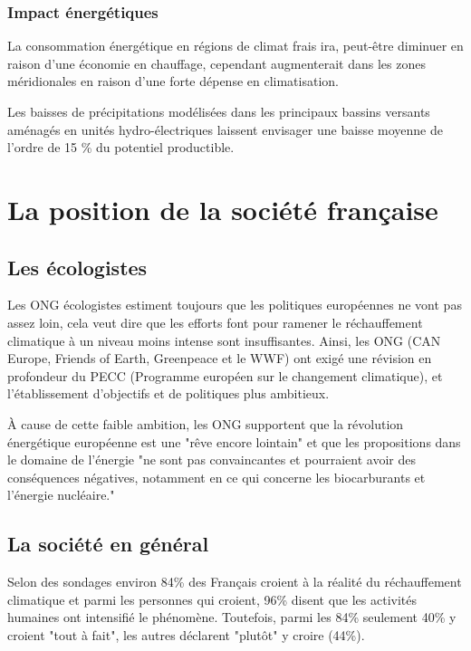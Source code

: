 \documentclass[a4paper,11pt]{article}
\begin{document}
\subsubsection*{Impact énergétiques}
La consommation énergétique  en régions de climat frais  ira, peut-être diminuer
en raison  d'une économie  en chauffage, cependant  augmenterait dans  les zones
méridionales en raison d'une forte dépense en climatisation.

Les baisses de précipitations modélisées dans les principaux bassins versants
aménagés en unités hydro-électriques laissent envisager une baisse moyenne de
l’ordre de 15 \% du potentiel productible.


\section{La position de la société française}
\subsection{Les écologistes}

Les ONG écologistes estiment toujours que les politiques européennes ne vont pas
assez loin,  cela veut dire que  les efforts font pour  ramener le réchauffement
climatique à  un niveau  moins intense sont  insuffisantes. Ainsi, les  ONG (CAN
Europe, Friends of Earth, Greenpeace et le WWF) ont exigé une 
révision  en   profondeur  du  PECC   (Programme  européen  sur   le  changement
climatique), et l'établissement d'objectifs et de politiques plus ambitieux. 

À cause de cette faible ambition, les ONG supportent que la révolution énergétique
européenne est une "rêve encore lointain" et que les propositions
dans le domaine de l'énergie "ne  sont pas convaincantes et pourraient avoir des
conséquences  négatives,  notamment en  ce  qui  concerne  les biocarburants  et
l'énergie nucléaire."



\subsection{La société en général} 

Selon des sondages environ 84\% des Français croient à la réalité du réchauffement
climatique et  parmi les  personnes qui croient,  96\% disent que  les activités
humaines ont intensifié le phénomène.
Toutefois, parmi les 84\% seulement 40\% y croient "tout à fait", les autres déclarent "plutôt" y
croire (44\%). 
\end{document}
